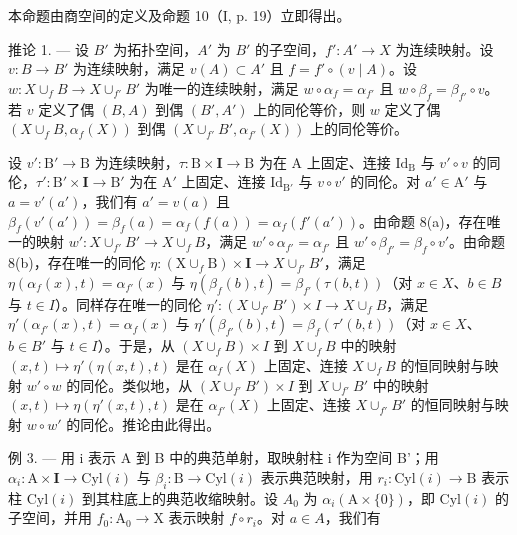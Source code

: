 本命题由商空间的定义及命题 10（I, p. 19）立即得出。

推论 1. --- 设 \(B'\) 为拓扑空间，\(A'\) 为 \(B'\) 的子空间，\(f': A' \to X\) 为连续映射。设 \(v: B \to B'\) 为连续映射，满足 \(v(A) \subset A'\) 且 \(f = f' \circ (v \mid A)\)。设 \(w: X \cup_f B \to X \cup_{f'} B'\) 为唯一的连续映射，满足 \(w \circ \alpha_f = \alpha_{f'}\) 且 \(w \circ \beta_f = \beta_{f'} \circ v\)。若 \(v\) 定义了偶 \((B, A)\) 到偶 \((B', A')\) 上的同伦等价，则 \(w\) 定义了偶 \((X \cup_f B, \alpha_f(X))\) 到偶 \((X \cup_{f'} B', \alpha_{f'}(X))\) 上的同伦等价。

设 \(v' \colon \mathrm{B}' \to \mathrm{B}\) 为连续映射，\(\tau \colon \mathrm{B} \times \mathbf{I} \to \mathrm{B}\) 为在 A 上固定、连接 \(\mathrm{Id}_{\mathrm{B}}\) 与 \(v' \circ v\) 的同伦，\(\tau' \colon \mathrm{B}' \times \mathbf{I} \to \mathrm{B}'\) 为在 \(\mathrm{A}'\) 上固定、连接 \(\mathrm{Id}_{\mathrm{B}'}\) 与 \(v \circ v'\) 的同伦。对 \(a' \in \mathrm{A}'\) 与 \(a = v'(a')\)，我们有 \(a' = v(a)\) 且 \(\beta_f(v'(a')) = \beta_f(a) = \alpha_f(f(a)) = \alpha_f(f'(a'))\)。由命题 8(a)，存在唯一的映射 \(w' \colon X \cup_{f'} B' \to X \cup_f B\)，满足 \(w' \circ \alpha_{f'} = \alpha_{f'}\) 且 \(w' \circ \beta_{f'} = \beta_f \circ v'\)。由命题 8(b)，存在唯一的同伦 \(\eta \colon (\mathrm{X} \cup_f \mathrm{B}) \times \mathbf{I} \to X \cup_{f'} B'\)，满足 \(\eta(\alpha_f(x), t) = \alpha_{f'}(x)\) 与 \(\eta(\beta_f(b), t) = \beta_{f'}(\tau(b, t))\)（对 \(x \in X\)、\(b \in B\) 与 \(t \in I\)）。同样存在唯一的同伦 \(\eta' \colon (X \cup_{f'} B') \times I \to X \cup_f B\)，满足 \(\eta'(\alpha_{f'}(x), t) = \alpha_f(x)\) 与 \(\eta'(\beta_{f'}(b), t) = \beta_f(\tau'(b, t))\)（对 \(x \in X\)、\(b \in B'\) 与 \(t \in I\)）。于是，从 \((X \cup_f B) \times I\) 到 \(X \cup_f B\) 中的映射 \((x, t) \mapsto \eta'(\eta(x, t), t)\) 是在 \(\alpha_f(X)\) 上固定、连接 \(X \cup_f B\) 的恒同映射与映射 \(w' \circ w\) 的同伦。类似地，从 \((X \cup_{f'} B') \times I\) 到 \(X \cup_{f'} B'\) 中的映射 \((x, t) \mapsto \eta(\eta'(x, t), t)\) 是在 \(\alpha_{f'}(X)\) 上固定、连接 \(X \cup_{f'} B'\) 的恒同映射与映射 \(w \circ w'\) 的同伦。推论由此得出。

例 3. --- 用 i 表示 A 到 B 中的典范单射，取映射柱 i 作为空间 B'；用 \(\alpha_{i}\colon\mathrm{A}\times\mathbf{I}\to\mathrm{Cyl}(i)\) 与 \(\beta_{i}\colon\mathrm{B}\to\mathrm{Cyl}(i)\) 表示典范映射，用 \(r_{i}\colon\mathrm{Cyl}(i)\to\mathrm{B}\) 表示柱 \(\mathrm{Cyl}(i)\) 到其柱底上的典范收缩映射。设 \(A_{0}\) 为 \(\alpha_{i}(\mathrm{A}\times\{0\})\)，即 \(\mathrm{Cyl}(i)\) 的子空间，并用 \(f_{0}\colon\mathrm{A}_{0}\to\mathrm{X}\) 表示映射 \(f\circ r_{i}\)。对 \(a\in A\)，我们有


